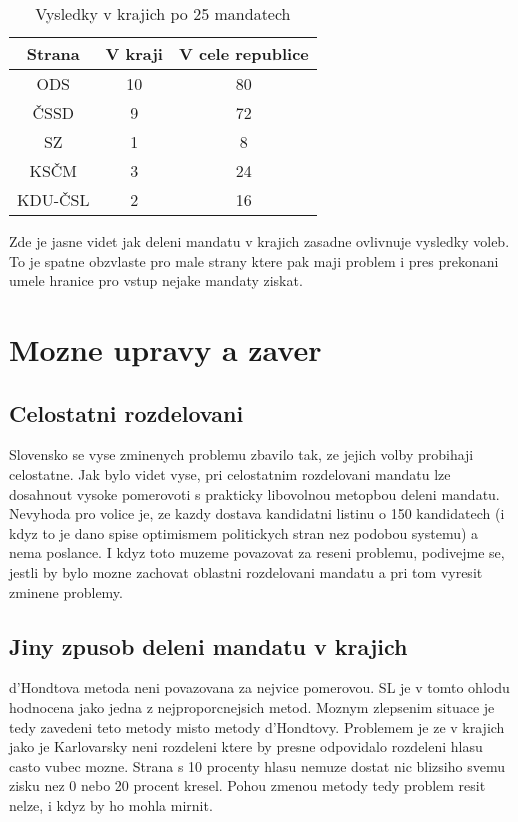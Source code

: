 \documentclass[12pt,a4paper]{scrreprt}
\begin{document}
\begin{table}
\begin{center}
\begin{tabular}{|c|c|c|}
\hline
Strana & V kraji & V cele republice\\
\hline 
ODS & 10 & 80\\
\hline
ČSSD & 9 & 72\\
\hline
SZ & 1 & 8\\
\hline
KSČM & 3 & 24\\
\hline
KDU-ČSL & 2 & 16\\
\hline 
\end{tabular} 
\caption{Vysledky v krajich po 25 mandatech}
\end{center}
\end{table}
Zde je jasne videt jak deleni mandatu v krajich zasadne ovlivnuje vysledky voleb.
To je spatne obzvlaste pro male strany ktere pak maji problem i pres prekonani umele hranice pro vstup nejake mandaty ziskat.
\chapter{Mozne upravy a zaver}
\section{Celostatni rozdelovani}
Slovensko se vyse zminenych problemu zbavilo tak, ze jejich volby probihaji celostatne.
Jak bylo videt vyse, pri celostatnim rozdelovani mandatu lze dosahnout vysoke pomerovoti s prakticky libovolnou metopbou deleni mandatu.
Nevyhoda pro volice je, ze kazdy dostava kandidatni listinu o 150 kandidatech (i kdyz to je dano spise optimismem politickych stran nez podobou systemu) a nema  poslance.
I kdyz toto muzeme povazovat za reseni problemu, podivejme se, jestli by bylo mozne zachovat oblastni rozdelovani mandatu a pri tom vyresit zminene problemy.
\section{Jiny zpusob deleni mandatu v krajich}
d'Hondtova metoda neni povazovana za nejvice pomerovou.
SL je v tomto ohlodu hodnocena jako jedna z nejproporcnejsich metod.\autocite{BEN}
Moznym zlepsenim situace je tedy zavedeni teto metody misto metody d'Hondtovy.
Problemem je ze v krajich jako je Karlovarsky neni rozdeleni ktere by presne odpovidalo rozdeleni hlasu casto vubec mozne.
Strana s 10 procenty hlasu nemuze dostat nic blizsiho svemu zisku nez 0 nebo 20 procent kresel.
Pohou zmenou metody tedy problem resit nelze, i kdyz by ho mohla mirnit.
\end{document}
